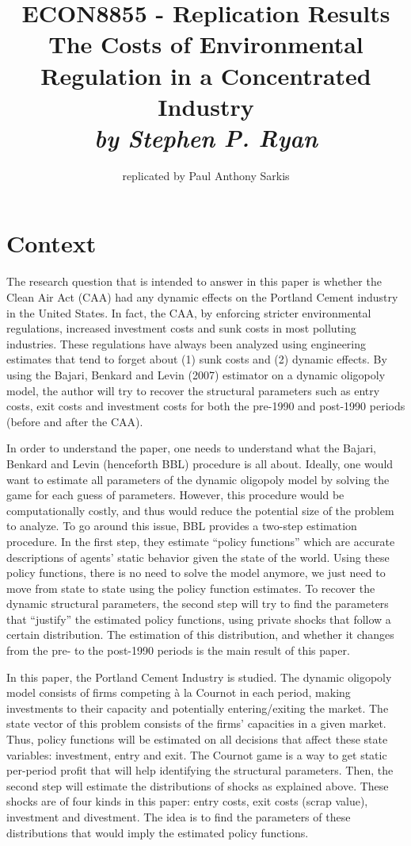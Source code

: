 \documentclass[12pt]{article}
\title{\vspace{-70pt} ECON8855 - Replication Results\\ \textbf{The Costs of Environmental Regulation in a Concentrated Industry} \\ \textit{by Stephen P. Ryan}}
\author{replicated by Paul Anthony Sarkis}
\begin{document}
\maketitle

\section{Context}

The research question that is intended to answer in this paper is whether the Clean Air Act (CAA) had any dynamic effects on the Portland Cement industry in the United States. In fact, the CAA, by enforcing stricter environmental regulations, increased investment costs and sunk costs in most polluting industries. These regulations have always been analyzed using engineering estimates that tend to forget about (1) sunk costs and (2) dynamic effects. By using the Bajari, Benkard and Levin (2007) estimator on a dynamic oligopoly model, the author will try to recover the structural parameters such as entry costs, exit costs and investment costs for both the pre-1990 and post-1990 periods (before and after the CAA). 

In order to understand the paper, one needs to understand what the Bajari, Benkard and Levin (henceforth BBL) procedure is all about. Ideally, one would want to estimate all parameters of the dynamic oligopoly model by solving the game for each guess of parameters. However, this procedure would be computationally costly, and thus would reduce the potential size of the problem to analyze. To go around this issue, BBL provides a two-step estimation procedure. In the first step, they estimate ``policy functions'' which are accurate descriptions of agents' static behavior given the state of the world. Using these policy functions, there is no need to solve the model anymore, we just need to move from state to state using the policy function estimates. To recover the dynamic structural parameters, the second step will try to find the parameters that ``justify'' the estimated policy functions, using private shocks that follow a certain distribution. The estimation of this distribution, and whether it changes from the pre- to the post-1990 periods is the main result of this paper.

In this paper, the Portland Cement Industry is studied. The dynamic oligopoly model consists of firms competing à la Cournot in each period, making investments to their capacity and potentially entering/exiting the market. The state vector of this problem consists of the firms' capacities in a given market. Thus, policy functions will be estimated on all decisions that affect these state variables: investment, entry and exit. The Cournot game is a way to get static per-period profit that will help identifying the structural parameters. Then, the second step will estimate the distributions of shocks as explained above. These shocks are of four kinds in this paper: entry costs, exit costs (scrap value), investment and divestment. The idea is to find the parameters of these distributions that would imply the estimated policy functions.
\end{document}
